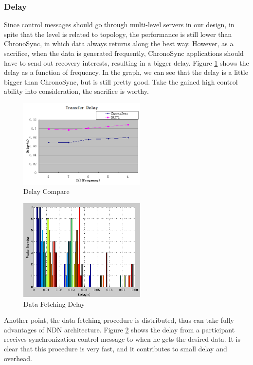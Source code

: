 \documentclass[conference]{IEEEtran}
\begin{document}
\subsubsection{Delay}
Since control messages should go through multi-level servers in our design, in spite that the level is related to topology, the performance is still lower than ChronoSync, in which data always returns along the best way. However, as a sacrifice, when the data is generated frequently, ChronoSync applications should have to send out recovery interests, resulting in a bigger delay. Figure \ref{delay_compare} shows the delay as a function of frequency. In the graph, we can see that the delay is a little bigger than ChronoSync, but is still pretty good. Take the gained high control ability into consideration, the sacrifice is worthy.
\begin{figure}[!t]
\centering
\includegraphics[width=2.5in]{../png/delay-compare.png}
\caption{Delay Compare}
\label{delay_compare}
\end{figure}

\begin{figure}[!t]
\centering
\includegraphics[width=2.5in]{../png/data-fetch-delay.png}
\caption{Data Fetching Delay}
\label{data_fetch_delay}
\end{figure}
Another point, the data fetching procedure is distributed, thus can take fully advantages of NDN architecture. Figure \ref{data_fetch_delay} shows the delay from a participant receives synchronization control message to when he gets the desired data. It is clear that this procedure is very fast, and it contributes to small delay and overhead.
\end{document}
